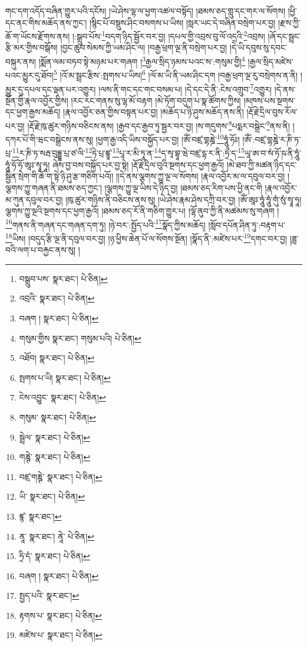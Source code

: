 གང་དག་འདོད་བཞིན་གྱུར་པའི་དངོས། །ཡེ་ཤེས་ལྷ་ལ་ཕྱག་འཚལ་བསྟོད། །ཐམས་ཅད་གླུ་དང་གར་ལ་སོགས། །ཕྱི་དང་ནང་གིས་མཆོད་ནས་ཀྱང་། །སྙིང་པོ་བསྡུས་ཤིང་བསགས་པ་ཡིས། །སླར་ཡང་དེ་བཞིན་བསྲེག་པར་བྱ། །རྫས་ཀྱི་ཆོ་ག་ཡོངས་རྫོགས་ནས། །:སྒྲུབ་པོས་\footnote{བསྒྲུབ་པས་  སྣར་ཐང་།  པེ་ཅིན། }བདག་ཉིད་སྦྱོར་བར་བྱ། །དཔལ་གྱི་འབྲས་བུ་ལོ་འདྲའི་\footnote{འབྲའི་  སྣར་ཐང་།  པེ་ཅིན། }འབྲས། །ཞོ་དང་སྦྲང་རྩི་མར་གྱིས་བསྒོས། །བྱང་ཆུབ་སེམས་ཀྱི་ཡམ་ཤིང་ལ། །བརྒྱ་ཕྲག་ལྔ་ནི་བསྲེག་པར་བྱ། །དེ་ཡི་དབུས་སུ་དབང་བསྐུར་ནས། །སྨོན་ལམ་བཏབ་སྟེ་མཉམ་པར་གཞག །\footnote{བཞག །  སྣར་ཐང་།  པེ་ཅིན། }རྒྱལ་སྲིད་ཉམས་པའང་ས་:གསུམ་གྱི།\footnote{གསུམ་གྱིས  སྣར་ཐང་། གསུམ་པའི།  པེ་ཅིན། } །རྒྱལ་སྲིད་མཛེས་པའང་མྱུར་དུ་ཐོབ།\footnote{འཐོབ།  སྣར་ཐང་།  པེ་ཅིན། } །འོ་མ་སྦྲང་རྩིས་:སྤགས་པ་ཡིས།\footnote{སྤགས་པ་ཡི།  སྣར་ཐང་།  པེ་ཅིན། } །ལོ་མ་ཡི་ནི་ཡམ་ཤིང་དག །བརྒྱ་ཕྲག་ལྔ་རུ་བསྲེགས་ན་ནི། །མྱུར་དུ་དཔལ་དང་ལྡན་པར་འགྱུར། །ལས་ནི་གང་དང་གང་བསམ་པ། །དེ་དང་དེ་ནི་:ངེས་འགྲུབ་\footnote{ངེས་འབྱུང་  སྣར་ཐང་།  པེ་ཅིན། }འགྱུར། །དེ་ནས་སྔོན་གྱི་རྣལ་འབྱོར་གྱིས། །རང་རང་གནས་སུ་ལྷ་མོ་བརྟག །མེ་ཏོག་བདུག་པ་སྣ་ཚོགས་ཀྱིས། །མཁས་པས་སྔགས་དང་ཕྱག་རྒྱས་མཆོད། །རྣལ་འབྱོར་ཅན་གྱིས་བསྟན་པར་བྱ། །མཆོད་པ་ཉི་ཤུས་མཆོད་ནས་ནི། །རྡོ་རྗེ་དྲིལ་བུས་རོལ་པར་བྱ། །རྡོ་རྗེ་ཁུ་ཚུར་གཉིས་བཅིངས་ནས། །རྒྱབ་དང་རྒྱབ་ཏུ་སྦྱར་བར་བྱ། །ས་གདུགས་\footnote{གསུམ་  སྣར་ཐང་།  པེ་ཅིན། }པདྨར་བསྒྲེང་\footnote{སྦྲེལ་  སྣར་ཐང་།  པེ་ཅིན། }ནས་ནི། །དཀར་པོ་གི་ཝང་བསྒྲེངས་ནས་སུ། །ཕྱག་རྒྱ་འདི་ཡིས་བསྐྱོད་པར་བྱ། །ཨོཾ་བཛྲ་གྷཎྜེ་\footnote{གཎྚེ་  སྣར་ཐང་།  པེ་ཅིན། }ཧཱུཾ་ཧོཿ། །ཨོཾ་:བཛྲ་གྷཎྜེ་ར་ཎི་ཏ་པྲ་\footnote{བཛྲ་གཎྚེ་  སྣར་ཐང་།  པེ་ཅིན། }ར་ཎི་ཏ་སརྦ་བུདྡྷ་པྲ་ཙ་ལི་\footnote{ཡི་  སྣར་ཐང་།  པེ་ཅིན། }ཏེ་པྲ་ཛྙཱ་\footnote{ཛྙ་  སྣར་ཐང་། }པཱ་ར་མི་ཏཱ་ན་\footnote{ནཱ་  སྣར་ཐང་། ནཱེ་  པེ་ཅིན། }ད་སྭ་བྷཱ་ཝེ་བཛྲ་དྷ་ར་ནི་:ཧྲྀ་ད་\footnote{ཧྲི་དཾ་  སྣར་ཐང་།  པེ་ཅིན། }ཡཱ་ཨ་བ་སཾ་ཏོ་ཥ་ནི་ཧཱུཾ་ཧཱུཾ་ཧོ་ཧོ་ཨཱཿ་སྭཱ་ཧཱ། ཞེས་བྱ་བས་བསྐྱོད་པར་བྱ་སྟེ། །རྡོ་རྗེ་དྲིལ་བུའི་སྔགས་དང་ཕྱག་རྒྱའོ། །མེ་ཐབ་ཀྱི་མཚན་ཉིད་དང་སྦྱིན་སྲེག་གི་ཆོ་ག་སྟེ་ཉི་ཤུ་རྩ་གཅིག་པའོ།། །།དེ་ནས་ལྕགས་ཀྱུ་ལྔ་ལ་སོགས། །རྣལ་འབྱོར་མ་ལ་དབུལ་བར་བྱ། །ལྕགས་ཀྱུ་གཞན་ནི་ཐམས་ཅད་ཀྱང་། །ལྕགས་ཀྱུ་ལྔ་ཡིས་དེ་ཉིད་བྱ། །ཐམས་ཅད་རིག་པས་ཕྱི་ནང་གི །རྣལ་འབྱོར་མ་ཀུན་དབུལ་བར་བྱ། །ཁུ་ཚུར་གཉིས་ནི་བཅིངས་ནས་སུ། །ཡེ་ཤེས་རྣམ་ཤེས་དཀྲི་བར་བྱ། །ཨོཾ་ཨཱཿ་ཧཱུཾ་ཧཱུཾ་གུཾ་སུཾ་སྭཱ་ཧཱ། ལྕགས་ཀྱུ་ལྔའི་སྔགས་དང་ཕྱག་རྒྱའོ། །ཐམས་ཅད་རོ་ནི་གཅིག་གྱུར་པ། །ལྷོ་ནུབ་ཀྱི་ནི་མཚམས་སུ་གཞག །\footnote{བཞག །  སྣར་ཐང་།  པེ་ཅིན། }གནས་ནི་གཞན་དང་གཞན་དག་ཏུ། །ཉེ་བར་:སྤྱོད་པའི་\footnote{སྤྱད་པའི་  སྣར་ཐང་། }སྣོད་ཀྱིས་མཆོད། །སློབ་དཔོན་ཤིན་ཏུ་:བརྟག་པ་\footnote{རྟགས་པ་  སྣར་ཐང་།  པེ་ཅིན། }ཡིས། །བདུད་རྩི་ལྔ་ནི་དབུལ་བར་བྱ། །ཉ་ཕྱིས་ཆེན་པོ་ལ་སོགས་སྔོན། །སྣོད་ནི་:མཛེས་པར་\footnote{མཛེས་པ་  སྣར་ཐང་།  པེ་ཅིན། }དགང་བར་བྱ། །ཟླ་བའི་ལག་པ་བརྐྱང་ནས་སུ། །
